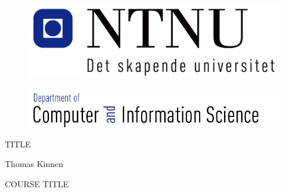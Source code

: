 \pagestyle{empty}

\begin{titlepage}
\begin{center}

\begin{figure}[!htb]
	\begin{center}
		\includegraphics[scale=0.50]{pics/ntnu}
	\end{center}
\end{figure}
\begin{figure}[!htb]
	\begin{center}
		\includegraphics[scale=0.40]{pics/idi}
	\end{center}
\end{figure}
\begin{LARGE}
\vspace{1.2in}

\end{LARGE}
\begin{Huge}
TITLE
\vspace{1.7in}


\end{Huge}
\begin{LARGE}
Thomas Kinnen \vspace{0.6in}
\end{LARGE}

\begin{Large}
COURSE TITLE
\vspace{0.8in}
\end{Large}



\end{center}

\end{titlepage}
